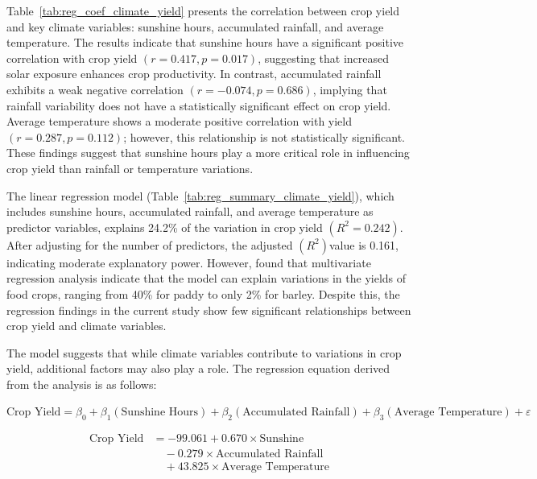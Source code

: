Table~\ref{tab:reg_coef_climate_yield} presents the correlation between crop yield and key climate variables: sunshine hours, accumulated rainfall, and average temperature.  The results indicate that sunshine hours have a significant positive correlation with crop yield $(r=0.417,p=0.017)$, suggesting that increased solar exposure enhances crop productivity. In contrast, accumulated rainfall exhibits a weak negative correlation $(r=-0.074,p=0.686)$, implying that rainfall variability does not have a statistically significant effect on crop yield. Average temperature shows a moderate positive correlation with yield $(r=0.287,p=0.112)$; however, this relationship is not statistically significant. These findings suggest that sunshine hours play a more critical role in influencing crop yield than rainfall or temperature variations.

The linear regression model (Table~\ref{tab:reg_summary_climate_yield}), which includes sunshine hours, accumulated rainfall, and average temperature as predictor variables, explains 24.2\% of the variation in crop yield $(R^2 = 0.242)$. After adjusting for the number of predictors, the adjusted $(R^2) $value is 0.161, indicating moderate explanatory power. However, \citet{maharjanEffectClimateVariables2013} found that multivariate regression analysis indicate that the model can explain variations in the yields of food crops, ranging from 40\% for paddy to only 2\% for barley. Despite this, the regression findings in the current study show few significant relationships between crop yield and climate variables.

The model suggests that while climate variables contribute to variations in crop yield, additional factors may also play a role. The regression equation derived from the analysis is as follows:  

$
\text{Crop Yield} = \beta_0 + \beta_1 (\text{Sunshine Hours}) + \beta_2 (\text{Accumulated Rainfall}) + \beta_3 (\text{Average Temperature}) + \varepsilon
$

\begin{equation}
    \begin{split}
        \text{Crop Yield} &= -99.061 + 0.670 \times \text{Sunshine} \\
        &\quad - 0.279 \times \text{Accumulated Rainfall} \\
        &\quad + 43.825 \times \text{Average Temperature}
    \end{split}
\end{equation}

